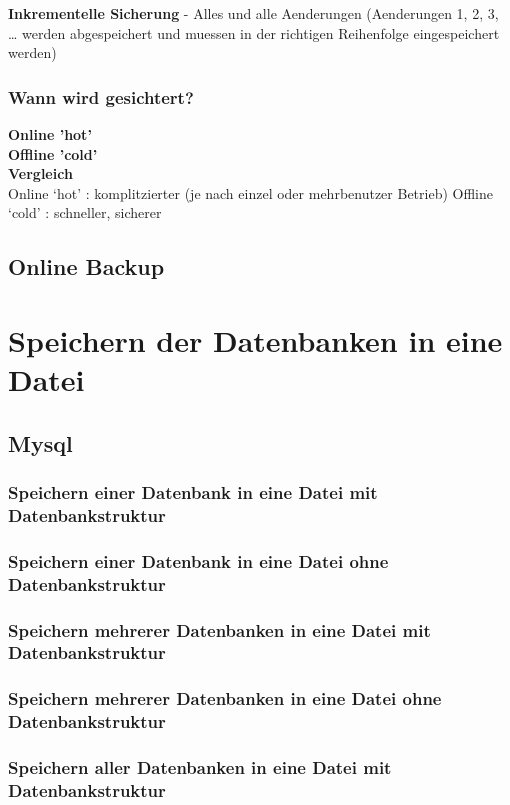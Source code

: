 \documentclass[10pt]{article}
\begin{document}
\textbf{Inkrementelle Sicherung} 
- Alles und alle Aenderungen
(Aenderungen 1, 2, 3, … werden abgespeichert und muessen in der richtigen Reihenfolge eingespeichert werden)
\subsubsection{Wann wird gesichtert?}

\textbf{Online 'hot'} \\
\textbf{Offline 'cold'} \\
\textbf{Vergleich} \\
Online ‘hot’ : komplitzierter (je nach einzel oder mehrbenutzer Betrieb)
Offline ‘cold’ :  schneller, sicherer






\subsection{Online Backup}

\section{Speichern der Datenbanken in eine Datei}
\subsection{Mysql}
\subsubsection{Speichern einer Datenbank in eine Datei mit Datenbankstruktur}
\subsubsection{Speichern einer Datenbank in eine Datei ohne Datenbankstruktur}
\subsubsection{Speichern mehrerer Datenbanken in eine Datei mit Datenbankstruktur}
\subsubsection{Speichern mehrerer Datenbanken in eine Datei ohne Datenbankstruktur}
\subsubsection{Speichern aller Datenbanken in eine Datei mit Datenbankstruktur}
\end{document}
